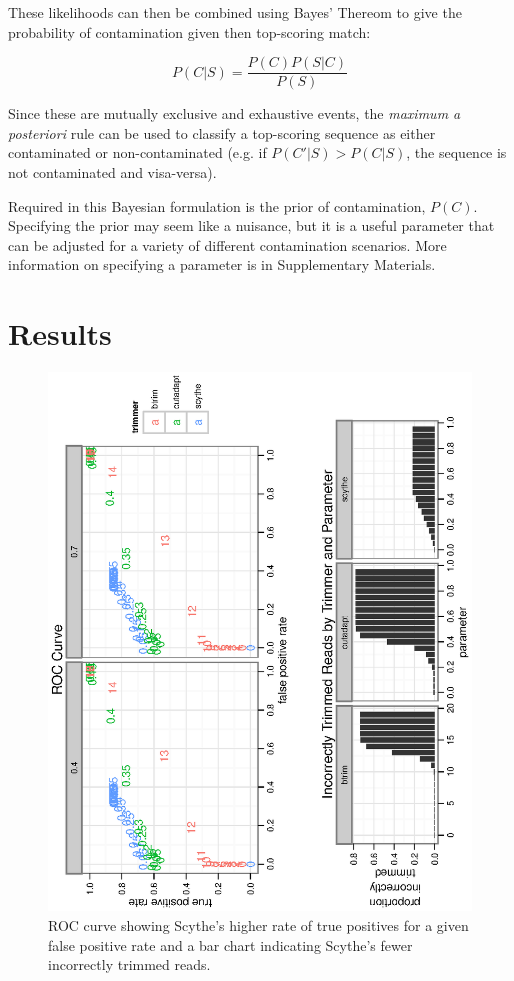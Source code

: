 \documentclass{bioinfo}
\begin{document}
\begin{methods}
These likelihoods can then be combined using Bayes' Thereom to give
the probability of contamination given then top-scoring match:

$$ P(C|S) = \frac{P(C) P(S|C)}{P(S)} $$

Since these are mutually exclusive and exhaustive events, the
\emph{maximum a posteriori} rule can be used to classify a top-scoring
sequence as either contaminated or non-contaminated (e.g. if $P(C'|S)
> P(C|S)$, the sequence is not contaminated and visa-versa).

Required in this Bayesian formulation is the prior of contamination,
$P(C)$. Specifying the prior may seem like a nuisance, but it is a
useful parameter that can be adjusted for a variety of different
contamination scenarios. More information on specifying a parameter is
in Supplementary Materials.

\section{Results}
\begin{centering}
\begin{figure}[!tpb]
\includegraphics[angle=-90]{graphics/roc-and-incorrect-trimmed.eps}
\caption{ROC curve showing Scythe's higher rate of true positives for
  a given false positive rate and a bar chart indicating Scythe's
  fewer incorrectly trimmed reads.}\label{fig:02}
\end{figure}
\end{centering}


\end{methods}
\end{document}
